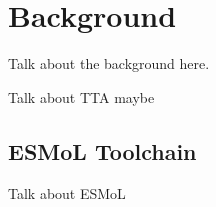 \section{Background}

Talk about the background here.

Talk about TTA maybe

\subsection{ESMoL Toolchain}

Talk about ESMoL